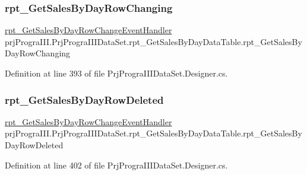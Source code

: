 \subsubsection{\texorpdfstring{rpt\+\_\+\+Get\+Sales\+By\+Day\+Row\+Changing}{rpt\_GetSalesByDayRowChanging}}
{\footnotesize\ttfamily \hyperlink{classprj_progra_i_i_i_1_1_prj_progra_i_i_i_data_set_aa1d46bd3c23f7f4fb63afc2bdb363a5b}{rpt\+\_\+\+Get\+Sales\+By\+Day\+Row\+Change\+Event\+Handler} prj\+Progra\+I\+I\+I.\+Prj\+Progra\+I\+I\+I\+Data\+Set.\+rpt\+\_\+\+Get\+Sales\+By\+Day\+Data\+Table.\+rpt\+\_\+\+Get\+Sales\+By\+Day\+Row\+Changing}



Definition at line 393 of file Prj\+Progra\+I\+I\+I\+Data\+Set.\+Designer.\+cs.

\hypertarget{classprj_progra_i_i_i_1_1_prj_progra_i_i_i_data_set_1_1rpt___get_sales_by_day_data_table_adbaa8db2475a2883a3b0ae03be9b071e}{}\label{classprj_progra_i_i_i_1_1_prj_progra_i_i_i_data_set_1_1rpt___get_sales_by_day_data_table_adbaa8db2475a2883a3b0ae03be9b071e} 
\subsubsection{\texorpdfstring{rpt\+\_\+\+Get\+Sales\+By\+Day\+Row\+Deleted}{rpt\_GetSalesByDayRowDeleted}}
{\footnotesize\ttfamily \hyperlink{classprj_progra_i_i_i_1_1_prj_progra_i_i_i_data_set_aa1d46bd3c23f7f4fb63afc2bdb363a5b}{rpt\+\_\+\+Get\+Sales\+By\+Day\+Row\+Change\+Event\+Handler} prj\+Progra\+I\+I\+I.\+Prj\+Progra\+I\+I\+I\+Data\+Set.\+rpt\+\_\+\+Get\+Sales\+By\+Day\+Data\+Table.\+rpt\+\_\+\+Get\+Sales\+By\+Day\+Row\+Deleted}



Definition at line 402 of file Prj\+Progra\+I\+I\+I\+Data\+Set.\+Designer.\+cs.

